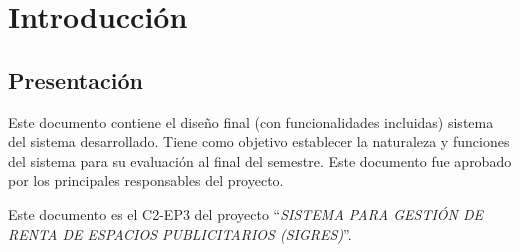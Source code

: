 \chapter{Introducción}


	

\section{Presentación}


	Este documento contiene el diseño final (con funcionalidades incluidas) sistema del sistema desarrollado. Tiene como objetivo establecer la naturaleza y funciones del sistema para su evaluación al final del semestre. Este documento fue aprobado por los principales responsables del proyecto.
	
	Este documento es el C2-EP3 del proyecto ``{\em SISTEMA PARA GESTIÓN DE RENTA DE ESPACIOS PUBLICITARIOS (SIGRES)}''.
	
